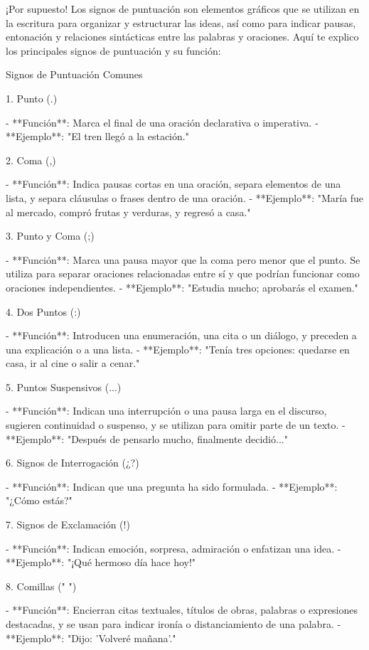 ¡Por supuesto! Los signos de puntuación son elementos gráficos que se utilizan en la escritura para organizar y estructurar las ideas, así como para indicar pausas, entonación y relaciones sintácticas entre las palabras y oraciones. Aquí te explico los principales signos de puntuación y su función:

 Signos de Puntuación Comunes

 1. Punto (.)

- **Función**: Marca el final de una oración declarativa o imperativa.
- **Ejemplo**: "El tren llegó a la estación."

 2. Coma (,)

- **Función**: Indica pausas cortas en una oración, separa elementos de una lista, y separa cláusulas o frases dentro de una oración.
- **Ejemplo**: "María fue al mercado, compró frutas y verduras, y regresó a casa."

 3. Punto y Coma (;)

- **Función**: Marca una pausa mayor que la coma pero menor que el punto. Se utiliza para separar oraciones relacionadas entre sí y que podrían funcionar como oraciones independientes.
- **Ejemplo**: "Estudia mucho; aprobarás el examen."

4. Dos Puntos (:)

- **Función**: Introducen una enumeración, una cita o un diálogo, y preceden a una explicación o a una lista.
- **Ejemplo**: "Tenía tres opciones: quedarse en casa, ir al cine o salir a cenar."

 5. Puntos Suspensivos (...)

- **Función**: Indican una interrupción o una pausa larga en el discurso, sugieren continuidad o suspenso, y se utilizan para omitir parte de un texto.
- **Ejemplo**: "Después de pensarlo mucho, finalmente decidió..."

 6. Signos de Interrogación (¿?)

- **Función**: Indican que una pregunta ha sido formulada.
- **Ejemplo**: "¿Cómo estás?"

 7. Signos de Exclamación (!)

- **Función**: Indican emoción, sorpresa, admiración o enfatizan una idea.
- **Ejemplo**: "¡Qué hermoso día hace hoy!"

 8. Comillas (" ")

- **Función**: Encierran citas textuales, títulos de obras, palabras o expresiones destacadas, y se usan para indicar ironía o distanciamiento de una palabra.
- **Ejemplo**: "Dijo: 'Volveré mañana'."

